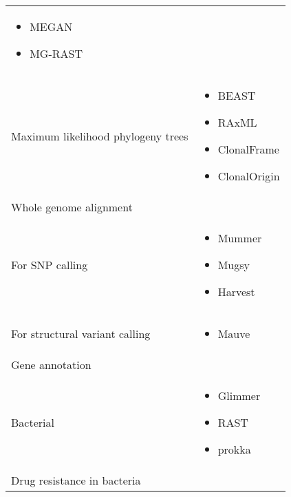 \begin{tabular}{l l}
\begin{minipage}[t]{5cm}
\begin{itemize}[noitemsep]
    \item MEGAN
    \item MG-RAST
    \end{itemize}
    \smallskip
  \end{minipage}
  \\
  Maximum likelihood phylogeny trees &
  \begin{minipage}[t]{5cm}
    \raggedright
    \begin{itemize}[noitemsep]
    \item BEAST
    \item RAxML
    \item ClonalFrame
    \item ClonalOrigin
    \end{itemize}
    \smallskip
  \end{minipage}
  \\
  Whole genome alignment &
  \\
  \-\tabindent For SNP calling &
  \begin{minipage}[t]{5cm}
    \raggedright
    \begin{itemize}[noitemsep]
    \item Mummer
    \item Mugsy
    \item Harvest
    \end{itemize}
    \smallskip
  \end{minipage}
  \\
  \-\tabindent For structural variant calling &
  \begin{minipage}[t]{5cm}
    \raggedright
    \begin{itemize}[noitemsep]
    \item Mauve
    \end{itemize}
    \smallskip
  \end{minipage}
  \\
  Gene annotation &
  \\
  \-\tabindent Bacterial &
  \begin{minipage}[t]{5cm}
    \raggedright
    \begin{itemize}[noitemsep]
    \item Glimmer
    \item RAST
    \item prokka
    \end{itemize}
    \smallskip
  \end{minipage}
  \\
  \-\tabindent Drug resistance in bacteria &
  \begin{minipage}[t]{5cm}

\end{minipage}
\end{tabular}
